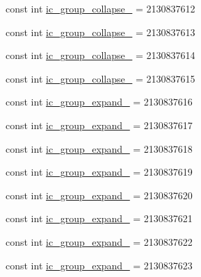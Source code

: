 \begin{DoxyCompactItemize}
\item 
const int \mbox{\hyperlink{class_f_w_p_s___app_1_1_droid_1_1_resource_1_1_drawable_a9ddb10669bc097560ed870dfbfa2130c}{ic\+\_\+group\+\_\+collapse\+\_}} = 2130837612
\item 
const int \mbox{\hyperlink{class_f_w_p_s___app_1_1_droid_1_1_resource_1_1_drawable_a1879db81f6ca1a48bc4e9826845eba74}{ic\+\_\+group\+\_\+collapse\+\_}} = 2130837613
\item 
const int \mbox{\hyperlink{class_f_w_p_s___app_1_1_droid_1_1_resource_1_1_drawable_a555f6ea407496f86f76c1e1564b86e5e}{ic\+\_\+group\+\_\+collapse\+\_}} = 2130837614
\item 
const int \mbox{\hyperlink{class_f_w_p_s___app_1_1_droid_1_1_resource_1_1_drawable_a25136143444b993be7235f2a1d5d056a}{ic\+\_\+group\+\_\+collapse\+\_}} = 2130837615
\item 
const int \mbox{\hyperlink{class_f_w_p_s___app_1_1_droid_1_1_resource_1_1_drawable_a6d28359eb5fcad756825ef72114550de}{ic\+\_\+group\+\_\+expand\+\_}} = 2130837616
\item 
const int \mbox{\hyperlink{class_f_w_p_s___app_1_1_droid_1_1_resource_1_1_drawable_a9ee6cd903c507f27366df725a8b805f0}{ic\+\_\+group\+\_\+expand\+\_}} = 2130837617
\item 
const int \mbox{\hyperlink{class_f_w_p_s___app_1_1_droid_1_1_resource_1_1_drawable_aef44fd3f1e3da5fbf454b14d0ac8a61c}{ic\+\_\+group\+\_\+expand\+\_}} = 2130837618
\item 
const int \mbox{\hyperlink{class_f_w_p_s___app_1_1_droid_1_1_resource_1_1_drawable_ae0617d25ec9d91ec4546447fab06e831}{ic\+\_\+group\+\_\+expand\+\_}} = 2130837619
\item 
const int \mbox{\hyperlink{class_f_w_p_s___app_1_1_droid_1_1_resource_1_1_drawable_a3f5ab6c24f7f64ae12dcd902839739b1}{ic\+\_\+group\+\_\+expand\+\_}} = 2130837620
\item 
const int \mbox{\hyperlink{class_f_w_p_s___app_1_1_droid_1_1_resource_1_1_drawable_a9e5fd71ab43c7a5e3fcfe37537540bea}{ic\+\_\+group\+\_\+expand\+\_}} = 2130837621
\item 
const int \mbox{\hyperlink{class_f_w_p_s___app_1_1_droid_1_1_resource_1_1_drawable_afd46d25667df4950d31fc668252c7465}{ic\+\_\+group\+\_\+expand\+\_}} = 2130837622
\item 
const int \mbox{\hyperlink{class_f_w_p_s___app_1_1_droid_1_1_resource_1_1_drawable_a59f036ab6002d522ec42d3a86b7debfc}{ic\+\_\+group\+\_\+expand\+\_}} = 2130837623
\item 

\end{DoxyCompactItemize}

